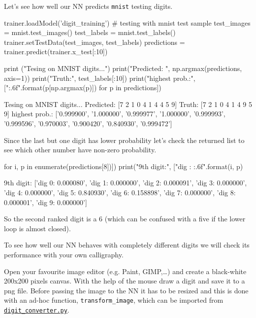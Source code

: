 Let's see how well our NN predicts \texttt{mnist} testing digits.

\begin{ipython}
trainer.loadModel('digit_training')
# testing with mnist test sample
test_images = mnist.test_images()
test_labels = mnist.test_labels()
trainer.setTestData(test_images, test_labels)
predictions = trainer.predict(trainer.x_test[:10])

print ("Tesing on MNIST digits...")
print("Predicted: ", np.argmax(predictions, axis=1))
print("Truth:", test_labels[:10])
print("highest prob.:", ["{:.6f}".format(p[np.argmax(p)]) for p in predictions])
\end{ipython}
\begin{ioutput}
Tesing on MNIST digits...
Predicted:  [7 2 1 0 4 1 4 4 5 9]
Truth: [7 2 1 0 4 1 4 9 5 9]
highest prob.: ['0.999900', '1.000000', '0.999977', '1.000000', '0.999993',
'0.999596', '0.970003', '0.900420', '0.840930', '0.999472']
\end{ioutput}

Since the last but one digit has lower probability let's check the returned list to see which other number have non-zero probability.

\begin{ipython}
for i, p in enumerate(predictions[8])])
    print("9th digit:", ["dig {}: {:.6f}".format(i, p)
\end{ipython}
\begin{ioutput}
9th digit: ['dig 0: 0.000080', 'dig 1: 0.000000', 'dig 2: 0.000091', 'dig 3:
0.000000', 'dig 4: 0.000000', 'dig 5: 0.840930', 'dig 6: 0.158898', 'dig 7:
0.000000', 'dig 8: 0.000001', 'dig 9: 0.000000']
\end{ioutput}

So the second ranked digit is a 6 (which can be confused with a five if the lower loop is almost closed).

To see how well our NN behaves with completely different digits we will check its performance with your own calligraphy. 

Open your favourite image editor (e.g. Paint, GIMP,\ldots) and create a black-white 200x200 pixels canvas. With the help of the mouse draw a digit and save it to a png file.
Before passing the image to the NN it has to be resized and this is done with an ad-hoc function, \texttt{transform\_image}, which can be imported from \href{https://raw.githubusercontent.com/matteosan1/finance_course/develop/libro/input_files/digit_converter.py}{\texttt{digit\_converter.py}}.


